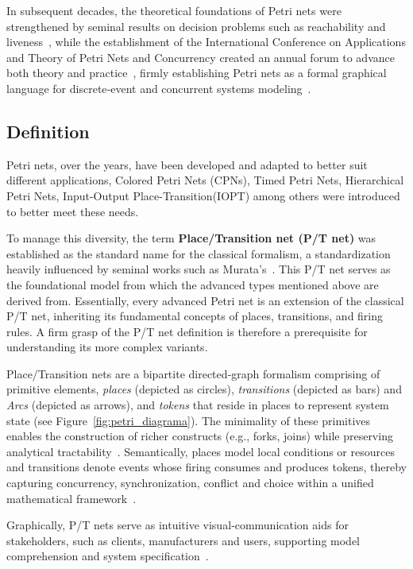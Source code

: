 In subsequent decades, the theoretical foundations of Petri nets were strengthened by seminal results on decision problems such as reachability and liveness~\cite{murata}, while the establishment of the International Conference on Applications and Theory of Petri Nets and Concurrency created an annual forum to advance both theory and practice~\cite{ICPN1980}, firmly establishing Petri nets as a formal graphical language for discrete‐event and concurrent systems modeling~\cite{WikiPetriNet2025}.

\subsection{Definition}
\label{subsec:definition}


Petri nets, over the years, have been developed and adapted to better suit different applications,  Colored Petri Nets (CPNs), Timed Petri Nets, Hierarchical Petri Nets, Input-Output Place-Transition(IOPT) among others were introduced to better meet these needs. 


To manage this diversity, the term \textbf{Place/Transition net (P/T net)} was established as the standard name for the classical formalism, a standardization heavily influenced by seminal works such as Murata's~\cite{murata}. This P/T net serves as the foundational model from which the advanced types mentioned above are derived from. Essentially, every advanced Petri net is an extension of the classical P/T net, inheriting its fundamental concepts of places, transitions, and firing rules. A firm grasp of the P/T net definition is therefore a prerequisite for understanding its more complex variants.

Place/Transition nets are a bipartite directed‐graph formalism comprising of primitive elements, \emph{places} (depicted as circles), \emph{transitions} (depicted as bars) and \emph{Arcs} (depicted as arrows), and \emph{tokens} that reside in places to represent system state (see Figure~\ref{fig:petri_diagrama}). The minimality of these primitives enables the construction of richer constructs (e.g., forks, joins) while preserving analytical tractability~\cite{50-years}. Semantically, places model local conditions or resources and transitions denote events whose firing consumes and produces tokens, thereby capturing concurrency, synchronization, conflict and choice within a unified mathematical framework~\cite{50-years}. 

Graphically, P/T nets serve as intuitive visual‐communication aids for stakeholders, such as clients, manufacturers and users, supporting model comprehension and system specification~\cite{pn-Wolfgang}.


